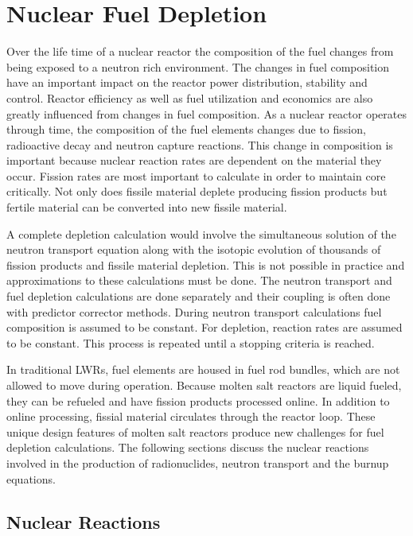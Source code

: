 \chapter{Nuclear Fuel Depletion} \label{ch:burnupEquations}
Over the life time of a nuclear reactor the composition of the fuel changes from being exposed to a neutron rich environment. The changes in fuel composition have an important impact on the reactor power distribution, stability and control. Reactor efficiency as well as fuel utilization and economics are also greatly influenced from changes in fuel composition. As a nuclear reactor operates through time, the composition of the fuel elements changes due to fission, radioactive decay and neutron capture reactions. This change in composition is important because nuclear reaction rates are dependent on the material they occur. Fission rates are most important to calculate in order to maintain core critically. Not only does fissile material deplete producing fission products but fertile material can be converted into new fissile material. 

A complete depletion calculation would involve the simultaneous solution of the neutron transport equation along with the isotopic evolution of thousands of fission products and fissile material depletion. This is not possible in practice and approximations to these calculations must be done. The neutron transport and fuel depletion calculations are done separately and their coupling is often done with predictor corrector methods. During neutron transport calculations fuel composition is assumed to be constant. For depletion, reaction rates are assumed to be constant. This process is repeated until a stopping criteria is reached. 

In traditional LWRs, fuel elements are housed in fuel rod bundles, which are not allowed to move during operation. Because molten salt reactors are liquid fueled, they can be refueled and have fission products processed online. In addition to online processing, fissial material circulates through the reactor loop. These unique design features of molten salt reactors produce new challenges for fuel depletion calculations. The following sections discuss the nuclear reactions involved in the production of radionuclides, neutron transport and the burnup equations.

\section{Nuclear Reactions}

